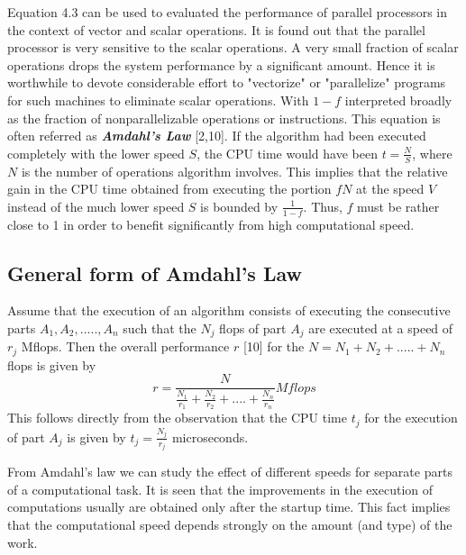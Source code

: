  Equation 4.3 can be used to evaluated the performance of parallel processors in the context of vector and scalar operations. It is found out that the parallel
processor is very sensitive to the scalar operations. A very small fraction of scalar operations drops the system performance by a significant amount. Hence
it is worthwhile to devote considerable effort to "vectorize" or "parallelize" programs for such machines to eliminate scalar operations. With $1-f$
interpreted broadly as the fraction of nonparallelizable operations or instructions. This equation is often referred as {\bf {\em Amdahl's Law}}
[2,10]. If the algorithm had been executed completely with the lower speed $S$, the CPU time would have been $t = \frac{N}{S}$, where $N$ is the number
of operations algorithm involves. This implies that the relative gain in the CPU time obtained from executing the portion $fN$ at the speed $V$ instead
of the much lower speed $S$ is bounded by $\frac{1}{1-f}$. Thus, $f$ must be rather close to 1 in order to benefit significantly from high computational
speed.

\subsection{General form of Amdahl's Law}
Assume that the execution of an algorithm consists of executing the consecutive parts $A_{1}, A_{2},.....,A_{n}$ such that the $N_{j}$ flops of part $A_{j}$
are executed at a speed of $r_{j}$ Mflops. Then the overall performance $r$ [10] for the $N = N_{1} + N_{2} +.....+ N_{n}$ flops is given by
\begin{equation}
r = \frac{N}{ \frac{N_{1}}{r_{1}} + \frac{N_{2}}{r_{2}} +....+ \frac{N_{n}}{r_{n}}} Mflops
\end{equation}
This follows directly from the observation that the CPU time $t_{j}$ for the execution of part $A_{j}$ is given by $t_{j} = \frac{N_{j}}{r_{j}}$ microseconds.
\par
\hspace{1in} From Amdahl's law we can study the effect of different speeds for separate parts of a computational task. It is seen that the improvements in the
execution of computations usually are obtained only after the startup time. This fact implies that the computational speed depends strongly on the amount (and
type) of the work. 

